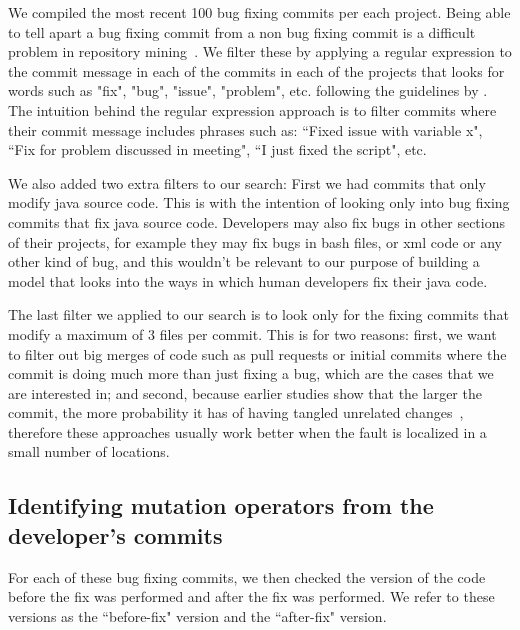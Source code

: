 \documentclass[conference]{IEEEtran}
\begin{document}
We compiled the most recent 100 bug fixing commits per each project. Being able to tell apart a bug fixing commit from a non bug fixing commit is a difficult problem in repository mining~\cite{Bird09}. We filter these by applying a regular expression to the commit message in each of the commits in each of the projects that looks for words such as "fix", "bug", "issue", "problem", etc. following the guidelines by \cite{schroter06,Cubranic05,Fischer03}.
The intuition behind the regular expression approach is to filter commits where their 
commit message includes phrases such as: ``Fixed issue with variable x", ``Fix for 
problem discussed in meeting", ``I just fixed the script", etc.

We also added two extra filters to our search: First we had commits that only 
modify java source code. This is with the intention of looking only into bug 
fixing commits that fix java source code. Developers may also fix bugs in other 
sections of their projects, for example they may fix bugs in bash files, or xml 
code or any other kind of bug, and this wouldn't be relevant to our purpose of 
building a model that looks into the ways in which human developers fix their 
java code.

The last filter we applied to our search is to look only for the fixing commits 
that modify a maximum of 3 files per commit. This is for two reasons: first, we 
want to filter out big merges of code such as pull requests or initial commits 
where the commit is doing much more than just fixing a bug, which are the cases 
that we are interested in; and second, because earlier studies show that the larger the commit, the more probability it has of having tangled unrelated changes~\cite{Dias15,Herzig13,Matsuda15,Kawrykow11}, therefore these approaches usually work 
better when the fault is localized in a small number of locations.

\subsection{Identifying mutation operators from the developer's commits}

For each of these bug fixing commits, we then checked the version of the code 
before the fix was performed and after the fix was performed. We refer to these 
versions as the ``before-fix" version and the ``after-fix" version.
\end{document}
